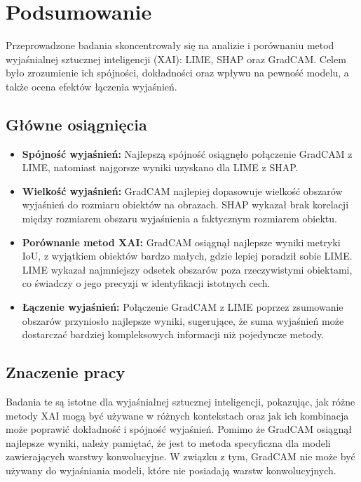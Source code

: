 
\chapter*{Podsumowanie}


Przeprowadzone badania skoncentrowały się na analizie i porównaniu metod wyjaśnialnej sztucznej inteligencji (XAI): LIME, SHAP oraz GradCAM. Celem było zrozumienie ich spójności, dokładności oraz wpływu na pewność modelu, a także ocena efektów łączenia wyjaśnień.

\section*{Główne osiągnięcia}

\begin{itemize}
	\item \textbf{Spójność wyjaśnień:} Najlepszą spójność osiągnęło połączenie GradCAM z LIME, natomiast najgorsze wyniki uzyskano dla LIME z SHAP.

	\item \textbf{Wielkość wyjaśnień:} GradCAM najlepiej dopasowuje wielkość obszarów wyjaśnień do rozmiaru obiektów na obrazach. SHAP wykazał brak korelacji między rozmiarem obszaru wyjaśnienia a faktycznym rozmiarem obiektu.

	\item \textbf{Porównanie metod XAI:} GradCAM osiągnął najlepsze wyniki metryki IoU, z wyjątkiem obiektów bardzo małych, gdzie lepiej poradził sobie LIME. LIME wykazał najmniejszy odsetek obszarów poza rzeczywistymi obiektami, co świadczy o jego precyzji w identyfikacji istotnych cech.

	\item \textbf{Łączenie wyjaśnień:} Połączenie GradCAM z LIME poprzez zsumowanie obszarów przyniosło najlepsze wyniki, sugerujące, że suma wyjaśnień może dostarczać bardziej kompleksowych informacji niż pojedyncze metody.
\end{itemize}

\section*{Znaczenie pracy}

Badania te są istotne dla wyjaśnialnej sztucznej inteligencji, pokazując, jak różne metody XAI mogą być używane w różnych kontekstach oraz jak ich kombinacja może poprawić dokładność i spójność wyjaśnień.
Pomimo że GradCAM osiągnął najlepsze wyniki, należy pamiętać, że jest to metoda specyficzna dla modeli zawierających warstwy konwolucyjne.
W związku z tym, GradCAM nie może być używany do wyjaśniania modeli, które nie posiadają warstw konwolucyjnych.


